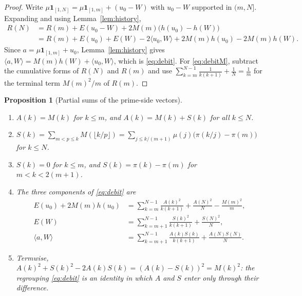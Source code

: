 \documentclass[11pt]{article}
\newtheorem{proposition}[theorem]{Proposition}
\theoremstyle{definition}
\theoremstyle{remark}
\newcommand{\ip}[2]{\langle #1,#2\rangle}
\begin{document}
\begin{proof}
Write $\mu\mathbf 1_{[1,N]}=\mu\mathbf 1_{[1,m]}+(u_0-W)$ with $u_0-W$ supported in $(m,N]$. Expanding and using Lemma~\ref{lem:history},
\begin{align*}
R(N)&=R(m)+E(u_0-W)+2M(m)\big(h(u_0)-h(W)\big)\\
&=R(m)+E(u_0)+E(W)-2\ip{u_0}W+2M(m)h(u_0)-2M(m)h(W).
\end{align*}
Since $a=\mu\mathbf 1_{[1,m]}+u_0$, Lemma~\ref{lem:history} gives $\ip aW=M(m)h(W)+\ip{u_0}W$, which is \eqref{eq:debit}. For \eqref{eq:debitM}, subtract the cumulative forms of $R(N)$ and $R(m)$ and use $\sum_{k=m}^{N-1}\frac1{k(k+1)}+\frac1N=\frac1m$ for the terminal term $M(m)^2/m$ of $R(m)$.
\end{proof}

\begin{proposition}[Partial sums of the prime-side vectors]\label{prop:partial}
\begin{enumerate}
\item[(i)] $A(k)=M(k)$ for $k\le m$, and $A(k)=M(k)+S(k)$ for all $k\le N$.
\item[(ii)] $S(k)=\sum_{m<p\le k}M(\lfloor k/p\rfloor)=\sum_{j\le k/(m+1)}\mu(j)\big(\pi(k/j)-\pi(m)\big)$ for $k\le N$.
\item[(iii)] $S(k)=0$ for $k\le m$, and $S(k)=\pi(k)-\pi(m)$ for $m<k<2(m+1)$.
\item[(iv)] The three components of \eqref{eq:debit} are
\begin{align}
E(u_0)+2M(m)h(u_0)&=\sum_{k=m}^{N-1}\frac{A(k)^2}{k(k+1)}+\frac{A(N)^2}N-\frac{M(m)^2}m,\label{eq:compA}\\
E(W)&=\sum_{k=m+1}^{N-1}\frac{S(k)^2}{k(k+1)}+\frac{S(N)^2}N,\label{eq:compS}\\
\ip aW&=\sum_{k=m+1}^{N-1}\frac{A(k)S(k)}{k(k+1)}+\frac{A(N)S(N)}N.\label{eq:compAS}
\end{align}
\item[(v)] Termwise, $A(k)^2+S(k)^2-2A(k)S(k)=(A(k)-S(k))^2=M(k)^2$: the regrouping \eqref{eq:debit} is an identity in which $A$ and $S$ enter only through their difference.
\end{enumerate}
\end{proposition}
\end{document}
